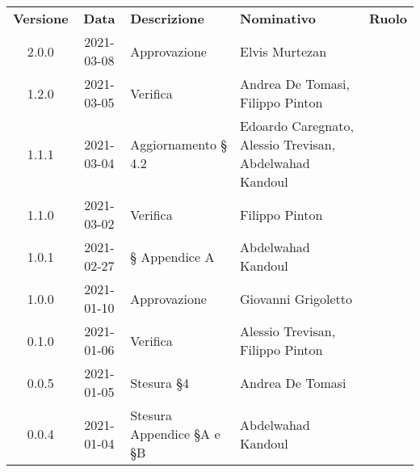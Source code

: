 {
    \renewcommand{\arraystretch}{1.5}
    \centering
    \begin{longtable}{ c c  C{3.5cm}  C{4cm}  c }
        \rowcolor{\primaryColor}
        \textcolor{\secondaryColor}{
        \textbf{Versione}}     & \textcolor{\secondaryColor}{\textbf{Data}}       & \textcolor{\secondaryColor}
        {\textbf{Descrizione}} & \textcolor{\secondaryColor}{\textbf{Nominativo}} & \textcolor{\secondaryColor}{\textbf{Ruolo}}                          \\


        2.0.0                  & 2021-03-08                                       & Approvazione             & Elvis Murtezan & \responsabile{}\\
        1.2.0                  & 2021-03-05                                       & Verifica             & Andrea De Tomasi, Filippo Pinton & \verificatore{}\\
        1.1.1                  & 2021-03-04                                       & Aggiornamento § 4.2              &Edoardo Caregnato, Alessio Trevisan, Abdelwahad Kandoul & \verificatore{}\\
        1.1.0                  & 2021-03-02                                       & Verifica             & Filippo Pinton & \verificatore{}\\
        1.0.1                  & 2021-02-27                                       & § Appendice A             &Abdelwahad Kandoul & \verificatore{}\\
        1.0.0                  & 2021-01-10                                       & Approvazione                                 &Giovanni Grigoletto & \responsabile{}\\
        0.1.0                  & 2021-01-06                                       & Verifica                                     & Alessio Trevisan, Filippo Pinton &\verificatore{}\\
        0.0.5                  & 2021-01-05                                       & Stesura §4                                   & Andrea De Tomasi & \verificatore{} \\
        0.0.4                  & 2021-01-04                                       & Stesura Appendice §A e §B                    & Abdelwahad Kandoul & \verificatore{} \\

\end{longtable}}
